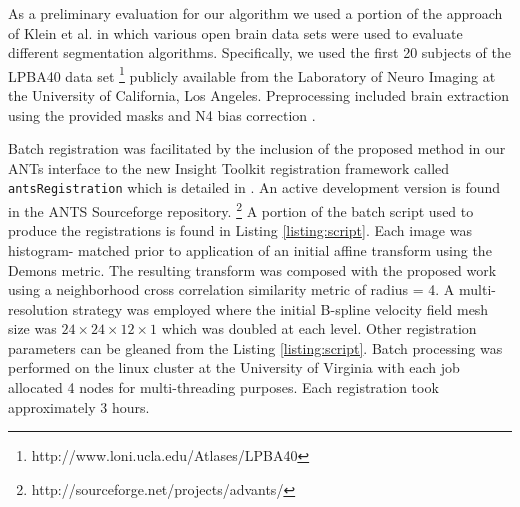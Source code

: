 \documentclass{llncs}
\begin{document}
As a preliminary evaluation for our algorithm we used a portion 
of the approach of Klein et al. \cite{Klein2009} in which 
various open brain data sets were used to evaluate different
segmentation algorithms.  Specifically, we used the first 20 
subjects of the LPBA40 data
set \cite{shattuck2008}%
\footnote{
http://www.loni.ucla.edu/Atlases/LPBA40
}
publicly available from the Laboratory of Neuro Imaging at
the University of California, Los Angeles.  Preprocessing included
brain extraction using the provided masks and N4 bias correction
\cite{tustison2010}.  

Batch registration was facilitated by the inclusion of the proposed
method in our ANTs interface to the new Insight Toolkit registration
framework called \verb#antsRegistration# which is detailed in 
\cite{tustison2012}.  An active development version is found in 
the ANTS Sourceforge repository.%
\footnote{
http://sourceforge.net/projects/advants/
}
A portion of the batch script used to produce the registrations is 
found in Listing \ref{listing:script}.  Each image was histogram-
matched prior to application of an initial affine transform using
the Demons metric.  The resulting transform was composed with the
proposed work using a neighborhood cross correlation similarity metric
\cite{avants2008} of radius = 4.  A multi-resolution strategy was 
employed where the initial B-spline velocity field mesh size was 
$24\times24\times12\times1$ which was doubled at each level.  
Other registration parameters can be gleaned from the Listing \ref{listing:script}.
Batch processing was performed on the linux cluster at the 
University of Virginia with each job allocated 4 nodes for
multi-threading purposes.  Each registration took approximately
3 hours.
\end{document}
